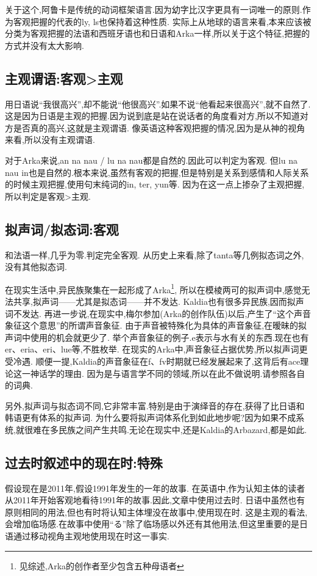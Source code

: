 关于这个,阿鲁卡是传统的动词框架语言.因为幼字比汉字更具有一词唯一的原则.作为客观把握的代表的ly, ls也保持着这种性质.
实际上从地球的语言来看,本来应该被分类为客观把握的法语和西班牙语也和日语和Arka一样,所以关于这个特征,把握的方式并没有太大影响.

\subsection{主观谓语:客观>主观}

用日语说“我很高兴”,却不能说“他很高兴”.如果不说“他看起来很高兴”,就不自然了.
这是因为日语是主观的把握.因为说到底是站在说话者的角度看对方,所以不知道对方是否真的高兴,这就是主观谓语.
像英语这种客观把握的情况,因为是从神的视角来看,所以没有主观谓语.

对于Arka来说,an na nau / lu na nau都是自然的.因此可以判定为客观.
但lu na nau in也是自然的.根本来说,虽然有客观的把握,但是特别是关系到感情和人际关系的时候主观把握,使用句末纯词的in, ter, yun等.
因为在这一点上掺杂了主观把握,所以判定是客观>主观.
\subsection{拟声词/拟态词:客观}

和法语一样,几乎为零.判定完全客观.
从历史上来看,除了tanta等几例拟态词之外,没有其他拟态词.

在现实生活中,异民族聚集在一起形成了Arka\footnote{见综述,Arka的创作者至少包含五种母语者},
所以在模棱两可的拟声词中,感觉无法共享,拟声词——尤其是拟态词——并不发达.
Kaldia也有很多异民族,因而拟声词不发达.
再进一步说,在现实中,梅尔参加(Arka的创作队伍)以后,产生了“这个声音象征这个意思”的所谓声音象征.
由于声音被特殊化为具体的声音象征,在暧昧的拟声词中使用的机会就更少了.
举个声音象征的例子.e表示与水有关的东西.现在也有er、eria、eri、lue等,不胜枚举.
在现实的Arka中,声音象征占据优势,所以拟声词更受冷遇.
顺便一提,Kaldia的声音象征在f、fv时期就已经发展起来了,这背后有ace理论这一神话学的理由.
因为是与语言学不同的领域,所以在此不做说明.请参照各自的词典.

另外,拟声词与拟态词不同,它非常丰富.特别是由于演绎音的存在,获得了比日语和韩语更有体系的拟声词.
为什么要将拟声词体系化到如此地步呢?因为如果不成系统,就很难在多民族之间产生共鸣.无论在现实中,还是Kaldia的Arbazard,都是如此.

\subsection{过去时叙述中的现在时:特殊}

假设现在是2011年,假设1991年发生的一年的故事.
在英语中,作为认知主体的读者从2011年开始客观地看待1991年的故事.因此,文章中使用过去时.
日语中虽然也有原则相同的用法,但也有时将认知主体埋没在故事中,使用现在时.
这是主观的看法,会增加临场感.在故事中使用“る”除了临场感以外还有其他用法,但这里重要的是日语通过移动视角主观地使用现在时这一事实.

